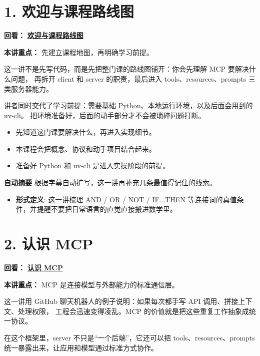 \documentclass[UTF8,a4paper,11pt]{ctexart}
\newcommand{\videolink}[2]{%
  \href{#1}{\textcolor{videoblue}{\textbf{#2}}}%
}
\begin{document}
\section*{1. 欢迎与课程路线图}
\noindent\textbf{回看：}\videolink{https://www.coursera.org/learn/introduction-to-model-context-protocol/home/module/1}{欢迎与课程路线图}

\textbf{本讲重点：} 先建立课程地图，再明确学习前提。

这一讲不是先写代码，而是先把整门课的路线图铺开：你会先理解 MCP 要解决什么问题，
再拆开 client 和 server 的职责，最后进入 tools、resources、prompts 三类服务器能力。

讲者同时交代了学习前提：需要基础 Python、本地运行环境，以及后面会用到的 uv-cli。
把环境准备好，后面的动手部分才不会被琐碎问题打断。

\begin{itemize}
  \item 先知道这门课要解决什么，再进入实现细节。
  \item 本课程会把概念、协议和动手项目结合起来。
  \item 准备好 Python 和 uv-cli 是进入实操阶段的前提。
\end{itemize}

\begin{keyconcept}
\textbf{自动摘要}
根据字幕自动扩写，这一讲再补充几条最值得记住的线索。
\begin{itemize}
  \item \textbf{形式定义}: 这一讲梳理 AND / OR / NOT / IF...THEN 等连接词的真值条件，并提醒不要把日常语言的直觉直接搬进数学里。
\end{itemize}
\end{keyconcept}

\section*{2. 认识 MCP}
\noindent\textbf{回看：}\videolink{https://www.coursera.org/learn/introduction-to-model-context-protocol/home/module/1}{认识 MCP}

\textbf{本讲重点：} MCP 是连接模型与外部能力的标准通信层。

这一讲用 GitHub 聊天机器人的例子说明：如果每次都手写 API 调用、拼接上下文、处理权限，
工程会迅速变得凌乱。MCP 的价值就是把这些重复工作抽象成统一协议。

在这个框架里，server 不只是“一个后端”，它还可以把 tools、resources、prompts
统一暴露出来，让应用和模型通过标准方式协作。
\end{document}
